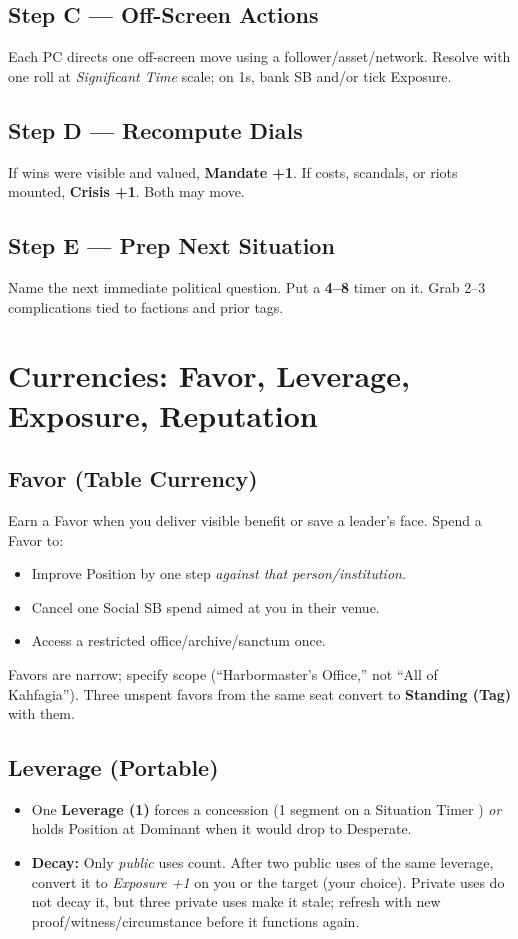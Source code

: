 \documentclass[11pt]{article}
\begin{document}
\subsection*{Step C --- Off-Screen Actions}
Each PC directs one off-screen move using a follower/asset/network. Resolve with one roll at \emph{Significant Time} scale; on 1s, bank SB and/or tick Exposure.

\subsection*{Step D --- Recompute Dials}
If wins were visible and valued, \textbf{Mandate +1}. If costs, scandals, or riots mounted, \textbf{Crisis +1}. Both may move.

\subsection*{Step E --- Prep Next Situation}
Name the next immediate political question. Put a \textbf{4--8} timer on it. Grab 2--3 complications tied to factions and prior tags.

\section{Currencies: Favor, Leverage, Exposure, Reputation}
\subsection{Favor (Table Currency)}
Earn a Favor when you deliver visible benefit or save a leader's face. Spend a Favor to:
\begin{itemize}
  \item Improve Position by one step \emph{against that person/institution}.
  \item Cancel one Social SB spend aimed at you in their venue.
  \item Access a restricted office/archive/sanctum once.
\end{itemize}
Favors are narrow; specify scope (``Harbormaster's Office,'' not ``All of Kahfagia''). Three unspent favors from the same seat convert to \textbf{Standing (Tag)} with them.

\subsection{Leverage (Portable)}
\begin{itemize}
  \item One \textbf{Leverage (1)} forces a concession (1 segment on a Situation Timer ) \emph{or} holds Position at Dominant when it would drop to Desperate.
  \item \textbf{Decay:} Only \emph{public} uses count. After two public uses of the same leverage, convert it to \emph{Exposure +1} on you or the target (your choice). Private uses do not decay it, but three private uses make it stale; refresh with new proof/witness/circumstance before it functions again.
\end{itemize}
\end{document}
